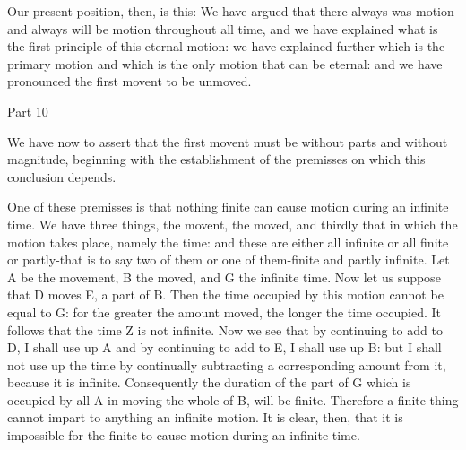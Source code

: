 Our present position, then, is this: We have argued that there always
was motion and always will be motion throughout all time, and we have
explained what is the first principle of this eternal motion: we have
explained further which is the primary motion and which is the only
motion that can be eternal: and we have pronounced the first movent
to be unmoved. 

Part 10

We have now to assert that the first movent must be without parts
and without magnitude, beginning with the establishment of the premisses
on which this conclusion depends. 

One of these premisses is that nothing finite can cause motion during
an infinite time. We have three things, the movent, the moved, and
thirdly that in which the motion takes place, namely the time: and
these are either all infinite or all finite or partly-that is to say
two of them or one of them-finite and partly infinite. Let A be the
movement, B the moved, and G the infinite time. Now let us suppose
that D moves E, a part of B. Then the time occupied by this motion
cannot be equal to G: for the greater the amount moved, the longer
the time occupied. It follows that the time Z is not infinite. Now
we see that by continuing to add to D, I shall use up A and by continuing
to add to E, I shall use up B: but I shall not use up the time by
continually subtracting a corresponding amount from it, because it
is infinite. Consequently the duration of the part of G which is occupied
by all A in moving the whole of B, will be finite. Therefore a finite
thing cannot impart to anything an infinite motion. It is clear, then,
that it is impossible for the finite to cause motion during an infinite
time. 

